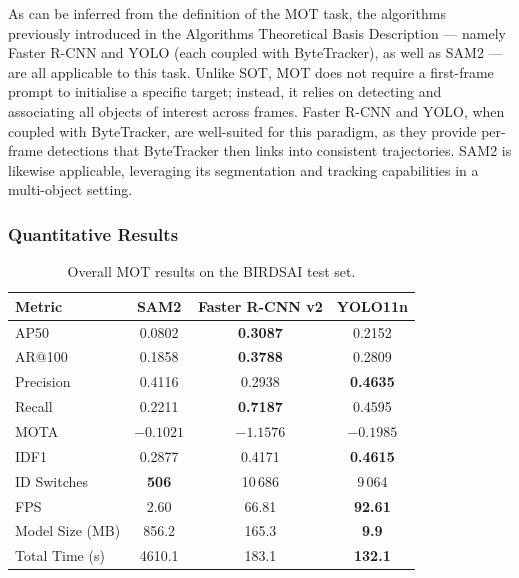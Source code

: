 \documentclass[
]{article}
\begin{document}
As can be inferred from the definition of the MOT task, the algorithms previously introduced in the Algorithms Theoretical Basis Description — namely Faster R-CNN and YOLO (each coupled with ByteTracker), as well as SAM2 — are all applicable to this task. 
Unlike SOT, MOT does not require a first-frame prompt to initialise a specific target; instead, it relies on detecting and associating all objects of interest across frames. 
Faster R-CNN and YOLO, when coupled with ByteTracker, are well-suited for this paradigm, as they provide per-frame detections that ByteTracker then links into consistent trajectories. 
SAM2 is likewise applicable, leveraging its segmentation and tracking capabilities in a multi-object setting.

\hypertarget{Quantitative Results}{%
\subsubsection{Quantitative Results}\label{MOT_Quantitative}}

\begin{table}[htbp]
\centering
\begin{tabular}{lccc}
\toprule
Metric & SAM2 & Faster R-CNN v2 & YOLO11n \\
\midrule
AP50            & 0.0802   & \textbf{0.3087} & 0.2152  \\
AR@100          & 0.1858   & \textbf{0.3788} & 0.2809  \\
Precision       & 0.4116   & 0.2938          & \textbf{0.4635} \\
Recall          & 0.2211   & \textbf{0.7187} & 0.4595  \\
MOTA            & $-0.1021$  & $-1.1576$         & \textbf{$-0.1985$} \\
IDF1            & 0.2877   & 0.4171          & \textbf{0.4615} \\
ID Switches     & \textbf{506} & 10\,686      & 9\,064  \\
FPS             & 2.60     & 66.81           & \textbf{92.61}  \\
Model Size (MB) & 856.2    & 165.3           & \textbf{9.9}    \\
Total Time (s)  & 4610.1   & 183.1           & \textbf{132.1}  \\
\bottomrule
\end{tabular}
\caption{Overall MOT results on the BIRDSAI test set.}
\label{tab:mot-overall}
\end{table}
\end{document}
